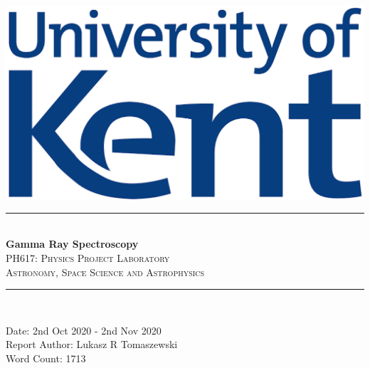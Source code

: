 \documentclass[12pt]{article}
\title{}
\begin{document}
\begin{titlepage}
\newcommand{\HRule}{\rule{\linewidth}{0.5mm}}
\begin{centering} 
\includegraphics[scale=0.7]{Images/Uni_of_Kent.png}\\[1cm]
\HRule \\ [0.3cm]
\Huge{\bfseries{Gamma Ray Spectroscopy}} \\
\textsc{\large PH617: Physics Project Laboratory}\\ [-0.1cm]
\textsc{\large Astronomy, Space Science and Astrophysics}\\ [-0.2cm]
\HRule \\[0.5cm]
\begin{minipage}{0.625\textwidth}
\begin{center} \large
{\large Date: 2nd Oct 2020 - 2nd Nov 2020}\\[0.2cm]
{\large Report Author: Lukasz R Tomaszewski}\\[0.2cm]
{\large Word Count: 1713}\\
\end{center}
\end{minipage}\\[2cm]
\vfill
\end{centering} 
\end{titlepage}
\newpage
\begin{titlepage}
\begin{tableofcontents}
\end{tableofcontents}
\end{titlepage}
\newpage
\end{document}

